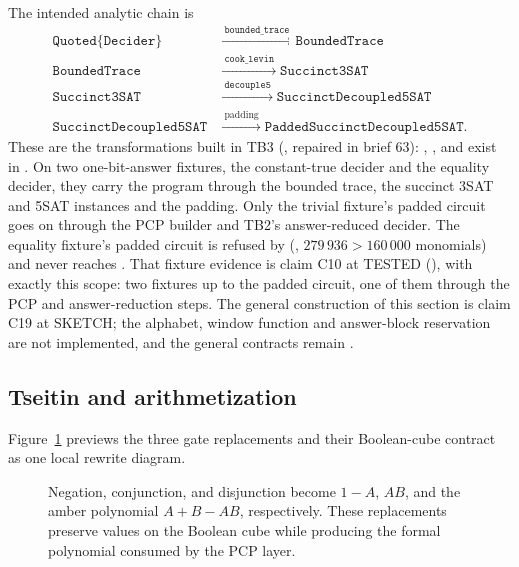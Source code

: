 The intended analytic chain is
\[
\begin{split}
\mathtt{Quoted\{Decider\}}
&\xrightarrow{\ \mathtt{bounded\_trace}\ }
 \mathtt{BoundedTrace}\\
\mathtt{BoundedTrace}
&\xrightarrow{\ \mathtt{cook\_levin}\ }
 \mathtt{Succinct3SAT}\\
\mathtt{Succinct3SAT}
&\xrightarrow{\ \mathtt{decouple5}\ }
 \mathtt{SuccinctDecoupled5SAT}
\\
\mathtt{SuccinctDecoupled5SAT}
&\xrightarrow{\ \mathrm{padding}\ }
 \mathtt{PaddedSuccinctDecoupled5SAT}.
\end{split}
\]
These are the transformations built in TB3 (,
repaired in brief 63): , ,
 and  exist in .  On two
one-bit-answer fixtures, the constant-true decider and the equality decider,
they carry the program through the bounded trace, the succinct 3SAT and 5SAT
instances and the padding.  Only the trivial fixture's padded circuit goes on
through the PCP builder and TB2's answer-reduced decider.  The equality
fixture's padded circuit is refused by 
(, \(279\,936>160\,000\) monomials) and never reaches
.  That fixture evidence is claim C10 at \textsc{TESTED}
(), with exactly this scope: two fixtures up to the
padded circuit, one of them through the PCP and answer-reduction steps.  The general construction of this section is claim C19 at
\textsc{SKETCH}; the alphabet, window function and answer-block reservation
are not implemented, and the general contracts remain .

\subsection{Tseitin and arithmetization}

Figure~\ref{fig:D-arithmetization-gates} previews the three gate replacements
and their Boolean-cube contract as one local rewrite diagram.
\begin{figure}[H]
\centering

\caption{Negation, conjunction, and disjunction become \(1-A\), \(AB\), and the amber polynomial \(A+B-AB\), respectively.  These replacements preserve values on the Boolean cube while producing the formal polynomial consumed by the PCP layer.}
\label{fig:D-arithmetization-gates}
\end{figure}

